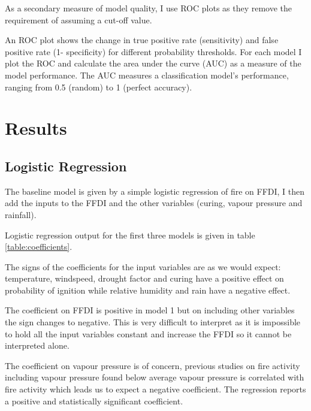\documentclass[11pt,a4paper]{article}
\begin{document}
 As a secondary measure of model quality, I use ROC plots as they remove the requirement of assuming a cut-off value. 

An ROC plot shows the change in true positive rate (sensitivity) and false positive rate (1- specificity) for different probability thresholds. For each model I plot the ROC and calculate the area under the curve (AUC) as a measure of the model performance. The AUC measures a classification model's performance, ranging from 0.5 (random) to 1 (perfect accuracy). 



\section{Results}

\subsection{Logistic Regression}

The baseline model is given by a simple logistic regression of fire on FFDI, I then add the inputs to the FFDI and  the other variables (curing, vapour pressure and rainfall). 

Logistic regression output for the first three models is given in table \ref{table:coefficients}. 

The signs of the coefficients for the input variables are as we would expect: temperature, windspeed, drought factor and curing have a positive effect on probability of ignition while relative humidity and rain have a negative effect. 


The coefficient on FFDI is positive in model 1 but on including other variables the  sign changes to negative. This is very difficult to interpret as it is impossible to hold all the input  variables constant and increase the FFDI so it cannot be interpreted alone. 

The coefficient on vapour pressure is of concern, previous studies on fire activity including vapour pressure \citep{harris14} found below average vapour pressure is correlated with fire activity which leads us to expect a negative coefficient. The regression reports a positive and statistically significant coefficient. 
\end{document}
